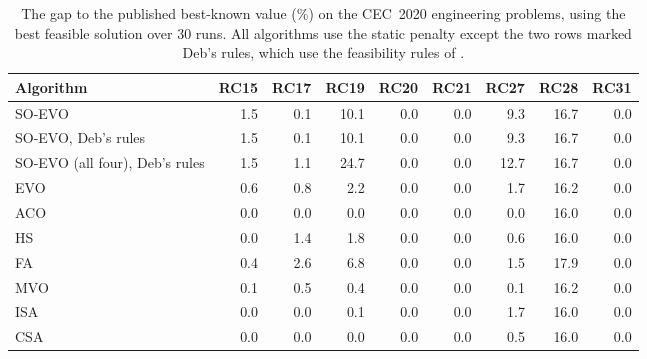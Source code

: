 \begin{table}[htbp]
\centering\footnotesize
\caption{The gap to the published best-known value (\%) on the CEC~2020 engineering problems, using the best feasible solution over 30 runs. All algorithms use the static penalty except the two rows marked Deb's rules, which use the feasibility rules of \citet{Deb2000}.}
\label{tab:engineering}
\begin{tabular}{lrrrrrrrr}
\toprule
Algorithm & RC15 & RC17 & RC19 & RC20 & RC21 & RC27 & RC28 & RC31 \\
\midrule
SO-EVO & 1.5 & 0.1 & 10.1 & 0.0 & 0.0 & 9.3 & 16.7 & 0.0 \\
SO-EVO, Deb's rules & 1.5 & 0.1 & 10.1 & 0.0 & 0.0 & 9.3 & 16.7 & 0.0 \\
SO-EVO (all four), Deb's rules & 1.5 & 1.1 & 24.7 & 0.0 & 0.0 & 12.7 & 16.7 & 0.0 \\
EVO & 0.6 & 0.8 & 2.2 & 0.0 & 0.0 & 1.7 & 16.2 & 0.0 \\
ACO & 0.0 & 0.0 & 0.0 & 0.0 & 0.0 & 0.0 & 16.0 & 0.0 \\
HS & 0.0 & 1.4 & 1.8 & 0.0 & 0.0 & 0.6 & 16.0 & 0.0 \\
FA & 0.4 & 2.6 & 6.8 & 0.0 & 0.0 & 1.5 & 17.9 & 0.0 \\
MVO & 0.1 & 0.5 & 0.4 & 0.0 & 0.0 & 0.1 & 16.2 & 0.0 \\
ISA & 0.0 & 0.0 & 0.1 & 0.0 & 0.0 & 1.7 & 16.0 & 0.0 \\
CSA & 0.0 & 0.0 & 0.0 & 0.0 & 0.0 & 0.5 & 16.0 & 0.0 \\
\bottomrule
\end{tabular}
\end{table}
